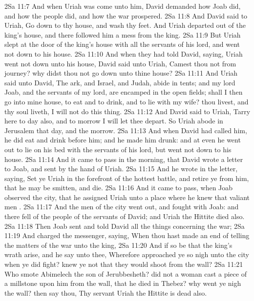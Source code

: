 \vs 2Sa 11:7 And when Uriah was come unto him, David demanded  how Joab did, and how the people did, and how the war prospered.
\vs 2Sa 11:8 And David said to Uriah, Go down to thy house, and wash thy feet. And Uriah departed out of the king's house, and there followed him a mess  from the king.
\vs 2Sa 11:9 But Uriah slept at the door of the king's house with all the servants of his lord, and went not down to his house.
\vs 2Sa 11:10 And when they had told David, saying, Uriah went not down unto his house, David said unto Uriah, Camest thou not from  journey? why  didst thou not go down unto thine house?
\vs 2Sa 11:11 And Uriah said unto David, The ark, and Israel, and Judah, abide in tents; and my lord Joab, and the servants of my lord, are encamped in the open fields; shall I then go into mine house, to eat and to drink, and to lie with my wife?  thou livest, and  thy soul liveth, I will not do this thing.
\vs 2Sa 11:12 And David said to Uriah, Tarry here to day also, and to morrow I will let thee depart. So Uriah abode in Jerusalem that day, and the morrow.
\vs 2Sa 11:13 And when David had called him, he did eat and drink before him; and he made him drunk: and at even he went out to lie on his bed with the servants of his lord, but went not down to his house.
\vs 2Sa 11:14 And it came to pass in the morning, that David wrote a letter to Joab, and sent  by the hand of Uriah.
\vs 2Sa 11:15 And he wrote in the letter, saying, Set ye Uriah in the forefront of the hottest battle, and retire ye from him, that he may be smitten, and die.
\vs 2Sa 11:16 And it came to pass, when Joab observed the city, that he assigned Uriah unto a place where he knew that valiant men .
\vs 2Sa 11:17 And the men of the city went out, and fought with Joab: and there fell  of the people of the servants of David; and Uriah the Hittite died also.
\vs 2Sa 11:18 Then Joab sent and told David all the things concerning the war;
\vs 2Sa 11:19 And charged the messenger, saying, When thou hast made an end of telling the matters of the war unto the king,
\vs 2Sa 11:20 And if so be that the king's wrath arise, and he say unto thee, Wherefore approached ye so nigh unto the city when ye did fight? knew ye not that they would shoot from the wall?
\vs 2Sa 11:21 Who smote Abimelech the son of Jerubbesheth? did not a woman cast a piece of a millstone upon him from the wall, that he died in Thebez? why went ye nigh the wall? then say thou, Thy servant Uriah the Hittite is dead also.
